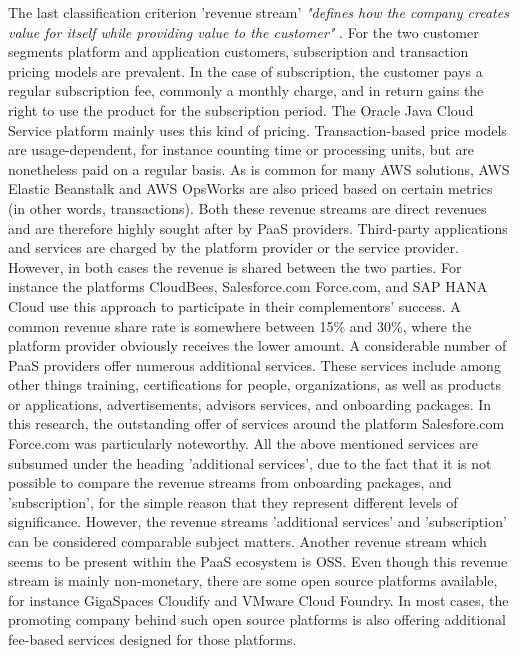 The last classification criterion 'revenue stream' \textit{"defines how the company creates value for itself while providing value to the customer"} \citep[p. 53]{Johnson2008}. For the two customer segments platform and application customers, subscription and transaction pricing models are prevalent. In the case of subscription, the customer pays a regular subscription fee, commonly a monthly charge, and in return gains the right to use the product for the subscription period. The Oracle Java Cloud Service platform mainly uses this kind of pricing. Transaction-based price models are usage-dependent, for instance counting time or processing units, but are nonetheless paid on a regular basis. As is common for many \ac{AWS} solutions, \ac{AWS} Elastic Beanstalk and \ac{AWS} OpsWorks are also priced based on certain metrics (in other words, transactions). Both these revenue streams are direct revenues and are therefore highly sought after by \ac{PaaS} providers. Third-party applications and services are charged by the platform provider or the service provider. However, in both cases the revenue is shared between the two parties. For instance the platforms CloudBees, Salesforce.com Force.com, and SAP HANA Cloud use this approach to participate in their complementors' success. A common revenue share rate is somewhere between 15\% and 30\%, where the platform provider obviously receives the lower amount. A considerable number of \ac{PaaS} providers offer numerous additional services. These services include among other things training, certifications for people, organizations, as well as products or applications, advertisements, advisors services, and onboarding packages. In this research, the outstanding offer of services around the platform Salesfore.com Force.com was particularly noteworthy. All the above mentioned services are subsumed under the heading 'additional services', due to the fact that it is not possible to compare the revenue streams from onboarding packages, and 'subscription', for the simple reason that they represent different levels of significance. However, the revenue streams 'additional services' and 'subscription' can be considered comparable subject matters. Another revenue stream which seems to be present within the \ac{PaaS} ecosystem is \ac{OSS}. Even though this revenue stream is mainly non-monetary, there are some open source platforms available, for instance GigaSpaces Cloudify and VMware Cloud Foundry. In most cases, the promoting company behind such open source platforms is also offering additional fee-based services designed for those platforms.

